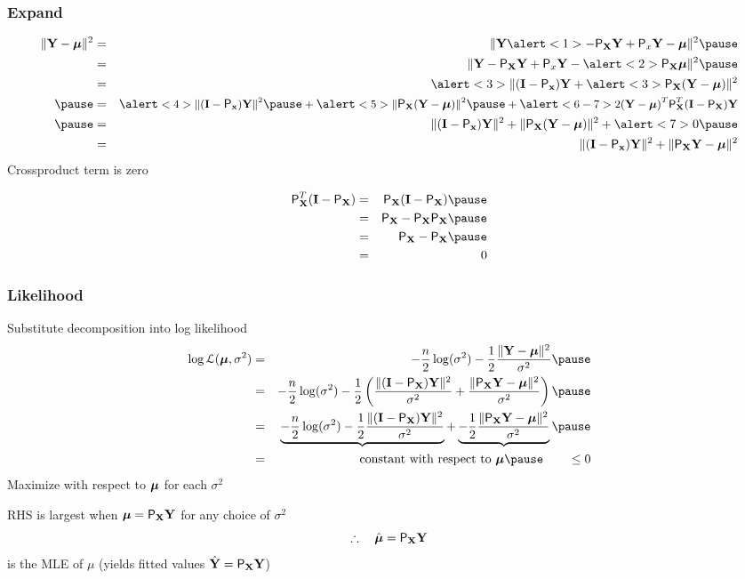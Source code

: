 \documentclass{beamer}
\begin{document}
\begin{frame}
  \frametitle{Expand}

  \begin{eqnarray*}
    \| \Y - \mub \|^2 & = & \| \Y  \alert<1>{- \P_\X \Y + \P_x \Y} -
    \mub \|^2 \pause \\
  & = & \| \Y - \P_\X \Y + \P_x \Y - \alert<2>{\P_\X}\mub \|^2 \pause \\
  & = & \alert<3>{\|(\I -\P_\x)}\Y +  \alert<3>{\P_\X}(\Y  - \mub)
  \|^2 \\\pause 
 & = & \alert<4>{\|(\I -\P_\x)\Y \|^2}\pause +  \alert<5>{\|
   {\P_\X}(\Y  - \mub) \|^2} \pause + \alert<6-7>{\small{2 (\Y -
\mub)^T \P_\X^T (\I - \P_\X) \Y }}\\ \pause 
 & = & \|(\I -\P_\x)\Y \|^2 +  \| {\P_\X}(\Y  - \mub) \|^2 + \alert<7>{0} \pause
 \\
 & = & \|(\I -\P_\x)\Y \|^2 +  \| {\P_\X}\Y  - \mub \|^2  
  \end{eqnarray*}  \pause 
Crossproduct term is zero \pause

\begin{eqnarray*}
  \P_\X^T (\I - \P_\X) & = &  \P_\X (\I - \P_\X) \pause \\
  & = &  \P_\X - \P_\X\P_\X \pause \\ 
 & = &  \P_\X - \P_\X  \pause \\
& = & 0
\end{eqnarray*}
\end{frame}
\begin{frame}
  \frametitle{Likelihood}
Substitute decomposition into log likelihood
\begin{eqnarray*}
 \log \cL(\mub, \sigma^2)  & = &
-\frac{n}{2} \log(\sigma^2) 
  - \frac 1 2 \frac{\| \Y - \mub \|^2}{\sigma^2} \pause \\
  & = & -\frac{n}{2} \log(\sigma^2)  - \frac 1 2 \left( \frac{\|(\I - \P_\X)
  \Y \|^2}{\sigma^2}  
 + \frac{\| \P_\X \Y - \mub\|^2 } {\sigma^2} \right)  \pause \\
 & = &  \underbrace { -\frac{n}{2} \log(\sigma^2)  - \frac 1 2  \frac{\|(\I - \P_\X)
  \Y \|^2}{\sigma^2} }  +  \underbrace{- \frac 1 2  \frac{\| \P_\X \Y -
  \mub\|^2 } {\sigma^2}}  \pause \\
 & = &  \text{ constant with respect to } \mub \pause \qquad  \leq 0 
\end{eqnarray*}   \pause
Maximize with respect to $\boldsymbol{\mu}$ for each $\sigma^2$ \pause

RHS is largest when $\boldsymbol{\mu} = \textsf{P}_{\mathbf{X}} \mathbf{Y}$  for any choice of $\sigma^2$\pause
$$\therefore \quad \hat{\boldsymbol{\mu}} = \textsf{P}_{\mathbf{X}} \mathbf{Y}$$
is the MLE of $\mu$ \pause (yields fitted values $\hat{\mathbf{Y}} = \textsf{P}_{\mathbf{X}} \mathbf{Y}$)
\end{frame}
\end{document}
